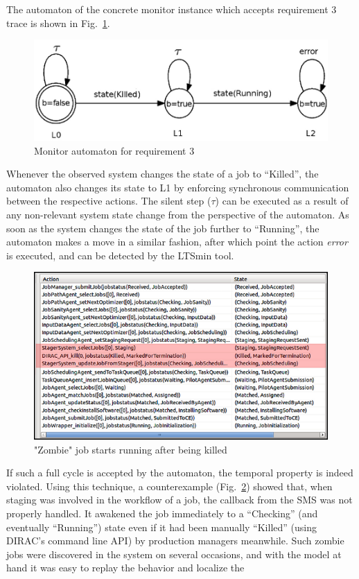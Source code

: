 \documentclass[sort&compress,preprint,3p]{elsarticle}
\begin{document}
The automaton of the concrete monitor instance which accepts requirement 3 trace is shown in Fig.~\ref{fig:monitorProcess}. 
\begin{figure}[tp]
\includegraphics[width=0.5\linewidth,keepaspectratio=true]{./graphics/Figure10.png}
\centering
\caption{Monitor automaton for requirement 3}
\label{fig:monitorProcess}
\end{figure}%
Whenever the observed system changes the state of a job to ``Killed'', the automaton also changes
its state to L1 by enforcing synchronous communication between the respective actions.
The silent step (${\tau}$) can be executed as a result of any non-relevant system state change
from the perspective of the automaton. As soon as the system changes the state of the job further
to ``Running'', the automaton makes a move in a similar fashion, after which point the action 
\textit{error} is executed, and can be detected by the LTSmin tool. 
\begin{figure}[bp]
\includegraphics[width=0.6\linewidth,keepaspectratio=true]{./graphics/Figure11.png}
\centering
\caption{"Zombie" job starts running after being killed}
\label{fig:zombieJob}
\end{figure}%
If such a full cycle is accepted by the automaton, the temporal property is indeed violated.
Using this technique, a counterexample (Fig.~\ref{fig:zombieJob}) showed that, when 
staging was involved in the workflow of a job, the callback from
the SMS was not properly handled.
It awakened the job immediately to a ``Checking'' (and eventually ``Running'') state
even if it had been manually ``Killed'' 
(using DIRAC's command line API) by production managers meanwhile. Such zombie jobs
were discovered in the system on several occasions,
and with the model at hand it was easy to replay the behavior and localize the
\end{document}
